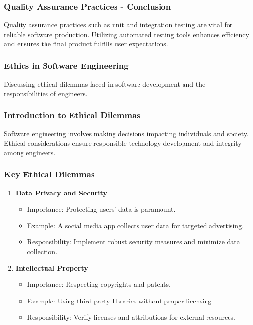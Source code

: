 \documentclass{beamer}
\begin{document}
\begin{frame}[fragile]
    \frametitle{Quality Assurance Practices - Conclusion}
    Quality assurance practices such as unit and integration testing are vital for reliable software production. Utilizing automated testing tools enhances efficiency and ensures the final product fulfills user expectations.
\end{frame}

\begin{frame}[fragile]
    \frametitle{Ethics in Software Engineering}
    Discussing ethical dilemmas faced in software development and the responsibilities of engineers.
\end{frame}

\begin{frame}[fragile]
    \frametitle{Introduction to Ethical Dilemmas}
    Software engineering involves making decisions impacting individuals and society. Ethical considerations ensure responsible technology development and integrity among engineers.
\end{frame}

\begin{frame}[fragile]
    \frametitle{Key Ethical Dilemmas}
    \begin{enumerate}
        \item \textbf{Data Privacy and Security}
            \begin{itemize}
                \item Importance: Protecting users' data is paramount.
                \item Example: A social media app collects user data for targeted advertising.
                \item Responsibility: Implement robust security measures and minimize data collection.
            \end{itemize}
        
        \item \textbf{Intellectual Property}
            \begin{itemize}
                \item Importance: Respecting copyrights and patents.
                \item Example: Using third-party libraries without proper licensing.
                \item Responsibility: Verify licenses and attributions for external resources.
            \end{itemize}
    \end{enumerate}
\end{frame}
\end{document}
